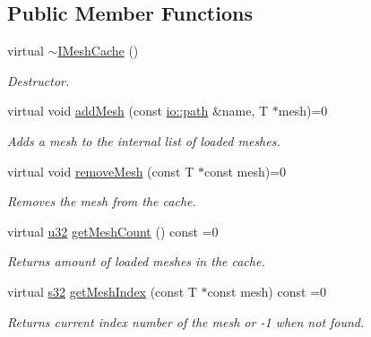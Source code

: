 \subsection*{Public Member Functions}
\begin{DoxyCompactItemize}
\item 
virtual \hyperlink{classirr_1_1scene_1_1IMeshCache_aac581c0d4c048446c282590447223435}{$\sim$\+I\+Mesh\+Cache} ()\hypertarget{classirr_1_1scene_1_1IMeshCache_aac581c0d4c048446c282590447223435}{}\label{classirr_1_1scene_1_1IMeshCache_aac581c0d4c048446c282590447223435}

\begin{DoxyCompactList}\small\item\em Destructor. \end{DoxyCompactList}\item 
virtual void \hyperlink{classirr_1_1scene_1_1IMeshCache_aaea60b117903d0f960d0e19df2bce39e}{add\+Mesh} (const \hyperlink{namespaceirr_1_1io_ab1bdc45edb3f94d8319c02bc0f840ee1}{io\+::path} \&name, T $\ast$mesh)=0
\begin{DoxyCompactList}\small\item\em Adds a mesh to the internal list of loaded meshes. \end{DoxyCompactList}\item 
virtual void \hyperlink{classirr_1_1scene_1_1IMeshCache_ab90eb5eca6864c96078d65e700223f45}{remove\+Mesh} (const T $\ast$const mesh)=0
\begin{DoxyCompactList}\small\item\em Removes the mesh from the cache. \end{DoxyCompactList}\item 
virtual \hyperlink{namespaceirr_a0416a53257075833e7002efd0a18e804}{u32} \hyperlink{classirr_1_1scene_1_1IMeshCache_a866c87d11246df2a3803d4689ee5ca4d}{get\+Mesh\+Count} () const  =0
\begin{DoxyCompactList}\small\item\em Returns amount of loaded meshes in the cache. \end{DoxyCompactList}\item 
virtual \hyperlink{namespaceirr_ac66849b7a6ed16e30ebede579f9b47c6}{s32} \hyperlink{classirr_1_1scene_1_1IMeshCache_a162b4e8fd055fd1a7b472c4ceb8f0fd5}{get\+Mesh\+Index} (const T $\ast$const mesh) const  =0
\begin{DoxyCompactList}\small\item\em Returns current index number of the mesh or -\/1 when not found. \end{DoxyCompactList}\item 

\end{DoxyCompactItemize}

